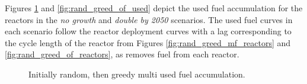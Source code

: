 Figures \ref{fig:rand_greed_mf_used} and \ref{fig:rand_greed_of_used} depict the used fuel accumulation for the reactors in the \textit{no growth} and \textit{double by 2050} scenarios. The used fuel curves in each scenario follow the reactor deployment curves with a lag corresponding to the cycle length of the reactor from Figures \ref{fig:rand_greed_mf_reactors} and \ref{fig:rand_greed_of_reactors}, as \cyclus removes fuel from each reactor.


\begin{figure}[H]
    \hfill
    \caption{Initially random, then greedy multi used fuel accumulation.}
    \label{fig:rand_greed_mf_used}
  \end{figure}


